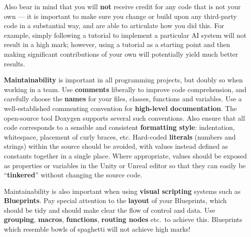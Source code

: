 \documentclass{../../fal_assignment}
\begin{document}
Also bear in mind that you will \textbf{not} receive credit for any code that is not your own ---
it is important to make sure you change or build upon any third-party code in a substantial way,
and are able to articulate how you did this.
For example, simply following a tutorial to implement a particular AI system will not result in a high mark;
however, using a tutorial as a starting point and then making significant contributions of your own will potentially yield much better results.

\textbf{Maintainability} is important in all programming projects,
but doubly so when working in a team.
Use \textbf{comments} liberally to improve code comprehension,
and carefully choose the \textbf{names} for your files, classes, functions and variables.
Use a well-established commenting convention
for \textbf{high-level documentation}.
The open-source tool Doxygen supports several such conventions.
Also ensure that all code corresponds to a sensible and consistent \textbf{formatting style}:
indentation, whitespace, placement of curly braces, etc.
Hard-coded \textbf{literals} (numbers and strings) within the source should be avoided,
with values instead defined as constants together in a single place.
Where appropriate, values should be exposed as properties or variables in the Unity or Unreal editor
so that they can easily be ``\textbf{tinkered}'' without changing the source code.

Maintainability is also important when using \textbf{visual scripting} systems such as \textbf{Blueprints}.
Pay special attention to the \textbf{layout} of your Blueprints,
which should be tidy and should make clear the flow of control and data.
Use \textbf{grouping}, \textbf{macros}, \textbf{functions}, \textbf{routing nodes} etc.\ to achieve this.
Blueprints which resemble bowls of spaghetti will not achieve high marks!


\end{document}
